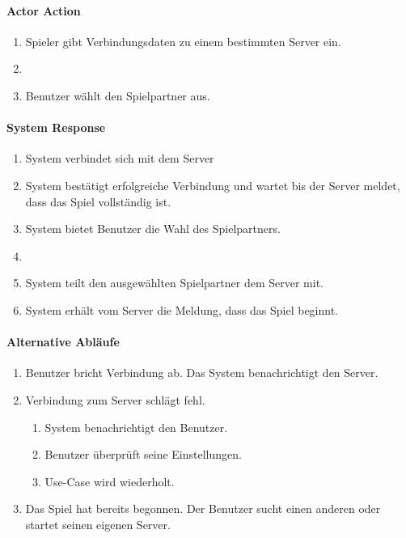 \documentclass[12pt,halfparskip]{scrartcl}
\begin{document}
\begin{multicols}{2}
\raggedcolumns
\paragraph{Actor Action}
\begin{enumerate}
	\item[1] Spieler gibt Verbindungsdaten zu einem bestimmten Server ein.
	\item[] \vspace{4 \lineheight}
	\item[5] Benutzer wählt den Spielpartner aus.
\end{enumerate}
\columnbreak
\paragraph{System Response}
\begin{enumerate}
	\item[2] System verbindet sich mit dem Server
	\item[3] System bestätigt erfolgreiche Verbindung und wartet bis der Server meldet, dass das Spiel vollständig ist.
	\item[4] System bietet Benutzer die Wahl des Spielpartners.
	\item[] \vspace{1 \lineheight}	
	\item[6] System teilt den ausgewählten Spielpartner dem Server mit.
	\item[7] System erhält vom Server die Meldung, dass das Spiel beginnt.
\end{enumerate}
\end{multicols}
\paragraph{Alternative Abläufe}
\begin{enumerate}
	\item[*a] Benutzer bricht Verbindung ab.\newline
	Das System benachrichtigt den Server.
	\item[2a] Verbindung zum Server schlägt fehl.
	\begin{enumerate}
		\item System benachrichtigt den Benutzer.
		\item Benutzer überprüft seine Einstellungen.
		\item Use-Case wird wiederholt.
	\end{enumerate}
	\item[2b] Das Spiel hat bereits begonnen.\newline
	Der Benutzer sucht einen anderen oder startet seinen eigenen Server.
\end{enumerate}
\end{document}
